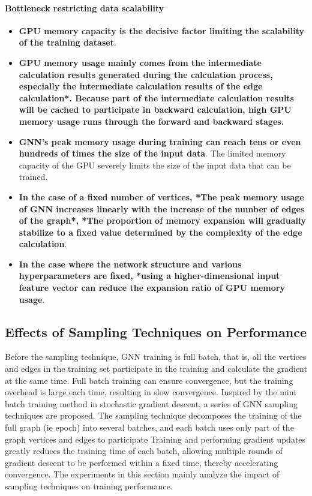 \paragraph{Bottleneck restricting data scalability}
\begin{itemize}
    \item \textbf{GPU memory capacity is the decisive factor limiting the scalability of the training dataset}.
    \item \textbf{GPU memory usage mainly comes from the intermediate calculation results generated during the calculation process,
     especially the intermediate calculation results of the edge calculation*. Because part of the intermediate calculation results
    will be cached to participate in backward calculation, high GPU memory usage runs through the forward and backward stages.}
    \item \textbf{GNN's peak memory usage during training can reach tens or even hundreds of times the size of the input data}. The limited memory capacity of the GPU severely limits the size of the input data that can be trained.
    \item \textbf{In the case of a fixed number of vertices, *The peak memory usage of GNN increases linearly with the increase of the number of edges of the graph*, *The proportion of memory expansion will gradually stabilize to a fixed value determined by the complexity of the edge calculation}.
    \item \textbf{In the case where the network structure and various hyperparameters are fixed, *using a higher-dimensional input feature vector can reduce the expansion ratio of GPU memory usage}.
\end{itemize}

\label{sec:memory_usage_analysis}
\subsection{Effects of Sampling Techniques on Performance}

Before the sampling technique, GNN training is full batch, that is, all the vertices and edges in the training set participate in the training and calculate the gradient at the same time.
Full batch training can ensure convergence, but the training overhead is large each time, resulting in slow convergence.
Inspired by the mini batch training method in stochastic gradient descent, a series of GNN sampling techniques are proposed.
The sampling technique decomposes the training of the full graph (ie epoch) into several batches, and
each batch uses only part of the graph vertices and edges to participate Training and performing gradient
updates greatly reduces the training time of each batch, allowing multiple rounds of gradient descent to
be performed within a fixed time, thereby accelerating convergence. The experiments in this section mainly
analyze the impact of sampling techniques on training performance.


